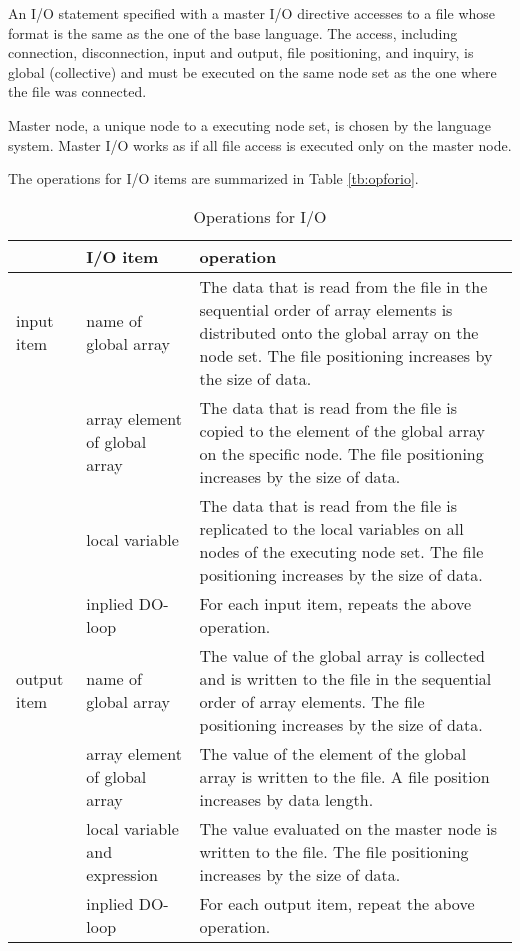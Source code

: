    An I/O statement specified with a master I/O directive accesses to a
   file whose format is the same as the one of the base language.
   The access, including connection, disconnection, input and output,
   file positioning, and inquiry, is global (collective) and must be
   executed on the same node set as the one where the file was
   connected. 

   Master node, a unique node to a executing node set, is chosen by the
   language system.
   Master I/O works as if all file access is executed only on the master
   node.

   The operations for I/O items are summarized in Table \ref{tb:opforio}.

   \begin{table}[h]
    \begin{center}
    \caption{Operations for I/O}
    \label{tb:opforio}
     \begin{tabular}{|l|p{40mm}|p{80mm}|}
      \hline
      \multicolumn{1}{|c}{ }  & {\bf I/O item} & {\bf operation} \\
      \hline
      input item & name of global array & The data that is read 
	      from the file in the sequential order of array elements is distributed onto 
	      the global array on the node set. The file positioning increases by
	      the size of data. \\
      \cline{2-3}
      & array element of global array &  The data that is read from the file
	      is copied to the element of the global array on the specific node.
	      The file positioning increases by the size of data. \\
      \cline{2-3}
      & local variable & The data that is read from the file is replicated to the
	      local variables on all nodes of the executing node
	      set. The file positioning increases by the size of data. \\
      \cline{2-3}
      & inplied DO-loop & For each input item, repeats the above operation. \\
      \hline
      output item & name of global array & The value of the
	      global array is collected and is written to the
	      file in the sequential order of array elements. The file
	      positioning increases by the size of data. \\
      \cline{2-3}
      & array element of global array &  The value of the element of the
	      global array is written to the
	      file. A file position increases by data length. \\
      \cline{2-3}
      & local variable and expression & The value evaluated on the master node
	      is written to the file. The file positioning increases by
	      the size of data. \\
      \cline{2-3}
      & inplied DO-loop & For each output item, repeat the above operation. \\
      \hline
      \end{tabular}
     \end{center}
    \label{tb:aaa}
   \end{table}

